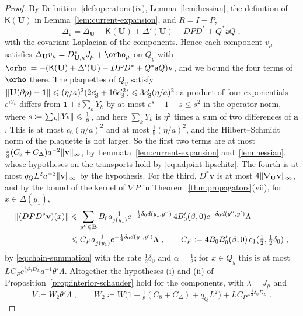 \documentclass[11pt]{preprint}
\let\rho\orho
\newcommand{\id}{\mathbf 1}
\DeclarePairedDelimiter{\norm}{\lVert}{\rVert}
\numberwithin{equation}{section}
\begin{document}
\begin{proof}
By Definition~\ref{def:operators}(iv), Lemma~\ref{lem:hessian}, the definition of $\mathsf K(\mathbf U)$ in Lemma~\ref{lem:current-expansion}, and $R = I - P$,
\[
    \Delta_{\mathsf a} = \Delta_{\mathbf U} + \mathsf K(\mathbf U) + \Delta'(\mathbf U) - DPD^* + Q^*\mathsf aQ\;,
\]
with the covariant Laplacian of the components. Hence each component $v_\mu$ satisfies $\Delta_{\mathbf U}v_\mu = D^*_{\mathbf U,\kappa}J_\mu + \rho_\mu$ on $Q_y$ with $\rho \coloneqq -(\mathsf K(\mathbf U) + \Delta'(\mathbf U) - DPD^* + Q^*\mathsf aQ)\mathbf v$, and we bound the four terms of $\rho$ there. The plaquettes of $Q_y$ satisfy $\norm{\mathbf U(\partial p) - \id} \leqslant (\eta/a)^2(2c'_{\mathrm S} + 16c_{\mathrm S}'^2) \leqslant 3c'_{\mathrm S}(\eta/a)^2$: a product of four exponentials $e^{iY_k}$ differs from $\id + i\sum_kY_k$ by at most $e^s - 1 - s \leqslant s^2$ in the operator norm, where $s \coloneqq \sum_k\norm{Y_k} \leqslant \frac{1}{8}$, and here $\sum_kY_k$ is $\eta^2$ times a sum of two differences of $\mathbf a$. This is at most $c_6(\eta/a)^2$ and at most $\frac{1}{8}(\eta/a)^2$, and the Hilbert--Schmidt norm of the plaquette is not larger. So the first two terms are at most $\frac{1}{8}(C_8 + C_\Delta)a^{-2}\norm{\mathbf v}_\infty$, by Lemmata~\ref{lem:current-expansion} and~\ref{lem:hessian}, whose hypotheses on the transports hold by \eqref{eq:adjoint-lipschitz}. The fourth is at most $q_QL^2a^{-2}\norm{\mathbf v}_\infty$ by the hypothesis. For the third, $D^*\mathbf v$ is at most $4\norm{\nabla_{\mathbf U}\mathbf v}_\infty$, and by the bound of the kernel of $\nabla P$ in Theorem~\ref{thm:propagators}(vii), for $x \in \Delta(y_1)$,
\begin{align*}
    \norm{(DPD^*\mathbf v)(x)} &\leqslant \sum_{y'' \in \mathbf B}B_0a_{j(y_1)}^{-1}e^{-\frac{1}{2}\delta_0d(y_1, y'')}\,4B'_0(\beta, 0)e^{-\delta_0d(y'', y')}\Lambda\\
    &\leqslant C_Pa_{j(y_1)}^{-1}e^{-\frac{1}{4}\delta_0d(y_1, y')}\Lambda\;,
    \qquad
    C_P \coloneqq 4B_0B'_0(\beta, 0)\,c_1(\tfrac{1}{2}, \tfrac{1}{2}\delta_0)\;,
\end{align*}
by \eqref{eq:chain-summation} with the rate $\frac{1}{2}\delta_0$ and $\alpha = \frac{1}{2}$; for $x \in Q_y$ this is at most $LC_Pe^{\frac{1}{4}\delta_0D_L}a^{-1}\theta'\Lambda$. Altogether the hypotheses (i) and (ii) of Proposition~\ref{prop:interior-schauder} hold for the components, with $\lambda = J_\mu$ and
\[
    V \coloneqq W_2\theta'\Lambda\;,
    \qquad
    W_2 \coloneqq W\bigl(1 + \tfrac{1}{8}(C_8 + C_\Delta) + q_QL^2\bigr) + LC_Pe^{\frac{1}{4}\delta_0D_L}\;.
\]
\end{proof}
\end{document}
